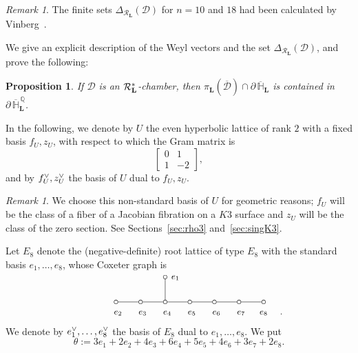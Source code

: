 \documentclass{amsart}
\theoremstyle{plain}
\newtheorem{proposition}[theorem]{Proposition}
\theoremstyle{definition}
\theoremstyle{remark}
\newtheorem{remark}[theorem]{Remark}
\numberwithin{equation}{section}
\numberwithin{table}{section}
\numberwithin{figure}{section}
\renewcommand{\H}{\mathord{\mathbb H}}
\newcommand{\Q}{\mathord{\mathbb  Q}}
\newcommand{\DDD}{\mathord{\mathcal D}}
\newcommand{\RRR}{\mathord{\mathcal R}}
\newcommand{\dual}{\sp{\vee}}
\newcommand{\bdr}{\partial\,}
\newcommand{\closure}[1]{\overline{#1}}
\renewcommand{\L}{\mathord{\mathbf{L}}}
\newcommand{\Roots}{\RRR}
\newcommand{\sphyp}{\sp*}
\newcommand{\clH}{\overline{\H}}
\newcommand{\bdrclH}{\bdr\clH}
\newcommand{\bdrclHQ}{\bdr\clH^{\,\Q}}
\begin{document}
%
\begin{remark}
The finite sets $\Delta_{\Roots_{\L}}(\DDD)$ for $n=10$ and $18$ had been  calculated by Vinberg~\cite{MR0422505}.
\end{remark}
%
We give an explicit description of the Weyl vectors and the set $\Delta_{\Roots_{\L}}(\DDD)$, 
and prove the following:
%
\begin{proposition}\label{prop:bdrQ}
If $\DDD$ is an $\Roots_{\L}\sphyp$-chamber,
then  $\pi_{\L}(\closure{\DDD})\cap \bdrclH_{\L}$ is contained in $\bdrclHQ_{\L}$.
\end{proposition}
%
%
%
In the following,
we  denote by $U$ the even hyperbolic lattice of rank $2$ with 
a fixed basis $f_U, z_U$, with respect to which the Gram matrix is 
%
\begin{equation}\label{eq:nonstandardU}
\left[
\begin{array}{cc}
0 & 1 \\
1 & -2 
\end{array}
\right],
\end{equation}
%
and  by  $f_U\dual, z_U\dual$ the basis of $U$ dual to $f_U, z_U$.
%
\begin{remark}
We choose this non-standard basis of $U$ for geometric reasons;
$f_U$ will be the class of a fiber of a Jacobian fibration on a $K3$ surface
and $z_U$ will be the class of the zero section.
See Sections~\ref{sec:rho3} and~\ref{sec:singK3}.
\end{remark}
%
Let $E_8$ denote  the (negative-definite) root lattice of type $E_8$
with 
the standard  basis $e_1, \dots, e_8$,  whose Coxeter graph is 
%
\begin{equation*}\label{eq:E8}
\def\ha{40}
\def\hav{37}
\def\hd{25}
\def\hdv{22}
\def\he{10}
\def\hev{7}
\setlength{\unitlength}{1.5mm}
\centerline{
{\small
\begin{picture}(100, 9)(-25, 7)
\put(22, 16){\circle{1}}
\put(23.5, 15.5){$e\sb 1$}
\put(22, 10.5){\line(0,1){5}}
\put(9.5, \hev){$e\sb 2$}
\put(15.5, \hev){$e\sb 3$}
\put(21.5, \hev){$e\sb 4$}
\put(27.5, \hev){$e\sb 5$}
\put(33.5, \hev){$e\sb 6$}
\put(39.5, \hev){$e\sb 7$}
\put(45, \hev){$e\sb {8}$}
\put(10, \he){\circle{1}}
\put(16, \he){\circle{1}}
\put(22, \he){\circle{1}}
\put(28, \he){\circle{1}}
\put(34, \he){\circle{1}}
\put(40, \he){\circle{1}}
\put(46, \he){\circle{1}}
\put(10.5, \he){\line(5, 0){5}}
\put(16.5, \he){\line(5, 0){5}}
\put(22.5, \he){\line(5, 0){5}}
\put(28.5, \he){\line(5, 0){5}}
\put(34.5, \he){\line(5, 0){5}}
\put(40.5, \he){\line(5, 0){5}}
\put(50, \hev){.}
\end{picture}
}
}
\end{equation*}
%
We denote by  $e_1\dual, \dots, e_8\dual$
the basis of $E_8$ dual to $e_1, \dots, e_8$.
We put
$$
\theta:=3e_1+2e_2+4e_3+6e_4+5e_5+4e_6+3e_7+2e_8.
$$
%
%
\end{document}
